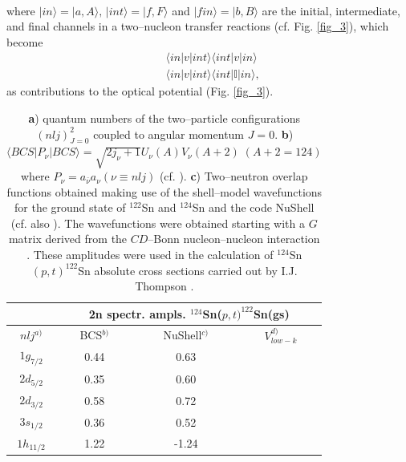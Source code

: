 \documentclass[a4paper,11pt]{book}
\numberwithin{equation}{section}
\numberwithin{figure}{section}
\numberwithin{table}{section}
\begin{document}
\begin{subappendices}
\begin{equation}
\begin{split}
\end{split}
\end{equation}
where $|in\rangle=|a,A\rangle,\,|int\rangle=|f,F\rangle$ and $|fin\rangle=|b,B\rangle$ are the initial, intermediate, and final channels in a two--nucleon transfer reactions (cf. Fig. \ref{fig_3}), which become
\begin{equation}
\begin{split}
&\langle in|v|int\rangle\langle int |v|in\rangle\\
&\langle in|v|int\rangle\langle int |\mathbb{I}|in\rangle,
\end{split}
\end{equation}
as contributions to the optical potential (Fig. \ref{fig_3}).
\begin{table}[h!]
{\begin{tabular}{|c|c|c|c|}
\cline{2-4} 
\multicolumn{1}{c|}{ }& \multicolumn{3}{|c|}{2n spectr. ampls. $^{124}$Sn($p,t)^{122}$Sn(gs)} \\
\hline
$nlj^{a)}$ & BCS$^{b)}$ & NuShell$^{c)}$ & $V_{low-k}^{d)}$\\
\hline
$1g_{7/2}$ & 0.44 & 0.63 & \\
$2d_{5/2}$ & 0.35 & 0.60 & \\
$2d_{3/2}$ & 0.58 & 0.72 & \\
$3s_{1/2}$ & 0.36 & 0.52 & \\
$1h_{11/2}$ & 1.22 & -1.24 & \\
\hline 
\end{tabular}}
\caption{\textbf{a}) quantum numbers of the two--particle configurations $(nlj)^2_{J=0}$ coupled to angular momentum $J=0$. \textbf{b}) $\langle BCS|P_\nu|BCS\rangle=\sqrt{2j_\nu+1}U_\nu(A) V_\nu(A+2)\;(A+2=124)$ where $P_\nu=a_{\bar\nu}a_\nu (\nu\equiv nlj)$ (cf. \cite{Potel:11,Potel:13,Potel:13b}). \textbf{c}) Two--neutron overlap functions obtained making use of the shell--model wavefunctions for the ground state of $^{122}$Sn and $^{124}$Sn and the code NuShell \citep{Brown:07} (cf. also \cite{Brown:05}). The wavefunctions were obtained starting with a $G$ matrix derived from the $CD$--Bonn nucleon--nucleon interaction \cite{Machleidt:96}. These amplitudes were used in the calculation of $^{124}$Sn$(p,t)^{122}$Sn absolute cross sections carried out by I.J. Thompson \citep{Thompson:13}.}\label{transnutT1}
\end{table}
\begin{figure}

\end{figure}
\end{subappendices}
\end{document}
